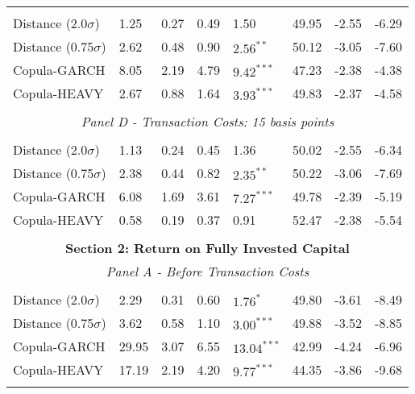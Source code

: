 \documentclass[a4paper,12pt]{report}
\begin{document}
\begin{threeparttable}[H]
\begin{tabularx}{\textwidth}{@{\extracolsep{\fill}}llllllll@{}}
		&       &       &       &       &       &       &  \\
		Distance (2.0$\sigma$) & 1.25  & 0.27  & 0.49  & 1.50  & 49.95 & -2.55  & -6.29 \\
		Distance (0.75$\sigma$) & 2.62  & 0.48  & 0.90  & $2.56^{**}$  & 50.12 & -3.05  & -7.60 \\
		Copula-GARCH & 8.05  & 2.19  & 4.79  & $9.42^{***}$  & 47.23 & -2.38  & -4.38 \\
		Copula-HEAVY & 2.67  & 0.88  & 1.64  & $3.93^{***}$  & 49.83 & -2.37  & -4.58 \\
		\multicolumn{1}{r}{} & \multicolumn{1}{r}{} & \multicolumn{1}{r}{} & \multicolumn{1}{r}{} & \multicolumn{1}{r}{} & \multicolumn{1}{r}{} & \multicolumn{1}{r}{} & \multicolumn{1}{r}{} \\
		\multicolumn{8}{c}{\textit{Panel D - Transaction Costs: 15 basis points}} \\
		&       &       &       &       &       &       &  \\
		Distance (2.0$\sigma$) & 1.13  & 0.24  & 0.45  & 1.36  & 50.02 & -2.55  & -6.34 \\
		Distance (0.75$\sigma$) & 2.38  & 0.44  & 0.82  & $2.35^{**}$  & 50.22 & -3.06  & -7.69 \\
		Copula-GARCH & 6.08  & 1.69  & 3.61  & $7.27^{***}$  & 49.78 & -2.39  & -5.19 \\
		Copula-HEAVY & 0.58  & 0.19  & 0.37  & 0.91  & 52.47 & -2.38  & -5.54 \\
		\multicolumn{1}{r}{} & \multicolumn{1}{r}{} & \multicolumn{1}{r}{} & \multicolumn{1}{r}{} & \multicolumn{1}{r}{} & \multicolumn{1}{r}{} & \multicolumn{1}{r}{} & \multicolumn{1}{r}{} \\
		\midrule
		\multicolumn{8}{c}{\textbf{Section 2: Return on Fully Invested Capital}} \\
		\multicolumn{8}{c}{\textit{Panel A - Before Transaction Costs}} \\
		&       &       &       &       &       &       &  \\
		Distance (2.0$\sigma$) & 2.29 & 0.31 & 0.60 & $1.76^{*}$ & 49.80 & -3.61 & -8.49 \\
		Distance (0.75$\sigma$) & 3.62 & 0.58 & 1.10 & $3.00^{***}$ & 49.88 & -3.52 & -8.85 \\
		Copula-GARCH & 29.95 & 3.07 & 6.55 & $13.04^{***}$ & 42.99 & -4.24 & -6.96 \\
		Copula-HEAVY & 17.19 & 2.19 & 4.20 & $9.77^{***}$ & 44.35 & -3.86 & -9.68 \\
		\multicolumn{1}{r}{} & \multicolumn{1}{r}{} & \multicolumn{1}{r}{} & \multicolumn{1}{r}{} & \multicolumn{1}{r}{} & \multicolumn{1}{r}{} & \multicolumn{1}{r}{} & \multicolumn{1}{r}{} \\

\end{tabularx}
\end{threeparttable}
\end{document}
